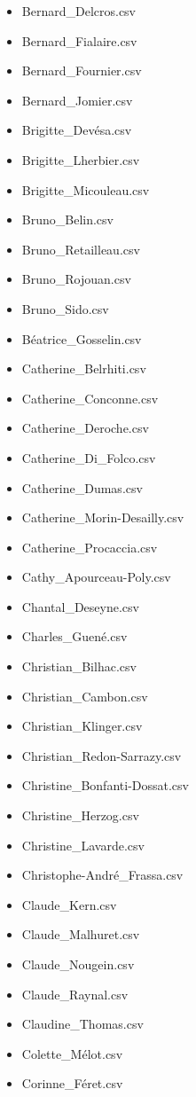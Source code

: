 \documentclass[a4paper,12pt,twoside]{book}
\begin{document}
\begin{itemize}
  \item Bernard\_Delcros.csv
  \item Bernard\_Fialaire.csv
  \item Bernard\_Fournier.csv
  \item Bernard\_Jomier.csv
  \item Brigitte\_Devésa.csv
  \item Brigitte\_Lherbier.csv
  \item Brigitte\_Micouleau.csv
  \item Bruno\_Belin.csv
  \item Bruno\_Retailleau.csv
  \item Bruno\_Rojouan.csv
  \item Bruno\_Sido.csv
  \item Béatrice\_Gosselin.csv
  \item Catherine\_Belrhiti.csv
  \item Catherine\_Conconne.csv
  \item Catherine\_Deroche.csv
  \item Catherine\_Di\_Folco.csv
  \item Catherine\_Dumas.csv
  \item Catherine\_Morin-Desailly.csv
  \item Catherine\_Procaccia.csv
  \item Cathy\_Apourceau-Poly.csv
  \item Chantal\_Deseyne.csv
  \item Charles\_Guené.csv
  \item Christian\_Bilhac.csv
  \item Christian\_Cambon.csv
  \item Christian\_Klinger.csv
  \item Christian\_Redon-Sarrazy.csv
  \item Christine\_Bonfanti-Dossat.csv
  \item Christine\_Herzog.csv
  \item Christine\_Lavarde.csv
  \item Christophe-André\_Frassa.csv
  \item Claude\_Kern.csv
  \item Claude\_Malhuret.csv
  \item Claude\_Nougein.csv
  \item Claude\_Raynal.csv
  \item Claudine\_Thomas.csv
  \item Colette\_Mélot.csv
  \item Corinne\_Féret.csv

\end{itemize}
\end{document}
